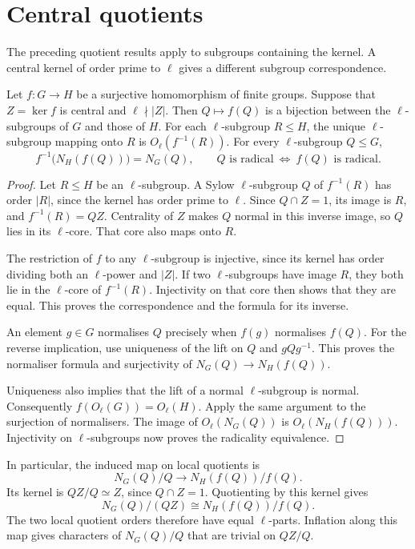 \section{Central quotients}

The preceding quotient results apply to subgroups containing the kernel.
A central kernel of order prime to $\ell$ gives a different subgroup
correspondence.

\begin{proposition}
\label{lib:groups:central-prime-to}
Let $f:G\to H$ be a surjective homomorphism of finite groups.
Suppose that $Z=\ker f$ is central and $\ell\nmid|Z|$.
Then $Q\mapsto f(Q)$ is a bijection between the $\ell$-subgroups
of $G$ and those of $H$. For each $\ell$-subgroup $R\leq H$, the unique
$\ell$-subgroup mapping onto $R$ is $O_\ell(f^{-1}(R))$.
For every $\ell$-subgroup $Q\leq G$,
\[
 f^{-1}\bigl(N_H(f(Q))\bigr)=N_G(Q),\qquad
 Q\text{ is radical}\ \Longleftrightarrow\ f(Q)\text{ is radical}.
\]
\end{proposition}
\begin{proof}
Let $R\leq H$ be an $\ell$-subgroup. A Sylow $\ell$-subgroup $Q$ of
$f^{-1}(R)$ has order $|R|$, since the kernel has order prime to
$\ell$. Since $Q\cap Z=1$, its image is $R$, and
$f^{-1}(R)=QZ$. Centrality of $Z$ makes $Q$ normal in this
inverse image, so $Q$ lies in its $\ell$-core. That core also
maps onto $R$.

The restriction of $f$ to any $\ell$-subgroup is injective,
since its kernel has order dividing both an $\ell$-power and
$|Z|$. If two $\ell$-subgroups have image $R$, they both lie
in the $\ell$-core of $f^{-1}(R)$. Injectivity on that core
then shows that they are equal. This proves the correspondence
and the formula for its inverse.

An element $g\in G$ normalises $Q$ precisely when $f(g)$
normalises $f(Q)$. For the reverse implication, use uniqueness
of the lift on $Q$ and $gQg^{-1}$. This proves the normaliser
formula and surjectivity of $N_G(Q)\to N_H(f(Q))$.

Uniqueness also implies that the lift of a normal
$\ell$-subgroup is normal. Consequently
$f(O_\ell(G))=O_\ell(H)$. Apply the same argument to the
surjection of normalisers. The image of $O_\ell(N_G(Q))$ is
$O_\ell(N_H(f(Q)))$. Injectivity on $\ell$-subgroups now
proves the radicality equivalence.
\end{proof}

In particular, the induced map on local quotients is
\[
 N_G(Q)/Q\longrightarrow N_H(f(Q))/f(Q).
\]
Its kernel is $QZ/Q\simeq Z$, since $Q\cap Z=1$. Quotienting by this
kernel gives
\[
 N_G(Q)/(QZ)\cong N_H(f(Q))/f(Q).
\]
The two local quotient orders therefore have equal $\ell$-parts.
Inflation along this map gives characters of $N_G(Q)/Q$ that are
trivial on $QZ/Q$.

